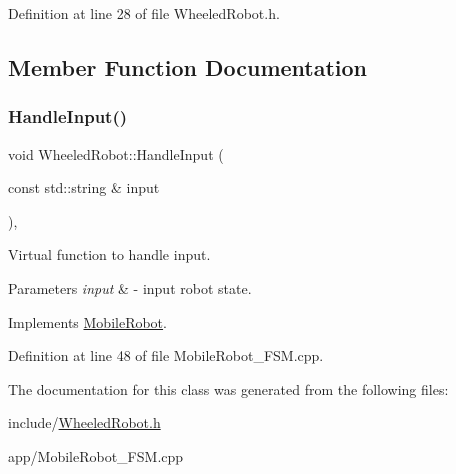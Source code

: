 Definition at line 28 of file Wheeled\+Robot.\+h.



\subsection{Member Function Documentation}
\mbox{\label{class_wheeled_robot_a481731d5b59ed97b432aac14de6036fd}} 
\subsubsection{\texorpdfstring{HandleInput()}{HandleInput()}}
{\footnotesize\ttfamily void Wheeled\+Robot\+::\+Handle\+Input (\begin{DoxyParamCaption}\item[{const std\+::string \&}]{input }\end{DoxyParamCaption})\hspace{0.3cm}{\ttfamily [override]}, {\ttfamily [virtual]}}



Virtual function to handle input. 


\begin{DoxyParams}{Parameters}
{\em input} & -\/ input robot state. \\
\hline
\end{DoxyParams}


Implements \mbox{\hyperlink{class_mobile_robot_a703aa7c008b6e9b5beb5017e7a6d020e}{Mobile\+Robot}}.



Definition at line 48 of file Mobile\+Robot\+\_\+\+F\+S\+M.\+cpp.



The documentation for this class was generated from the following files\+:\begin{DoxyCompactItemize}
\item 
include/\mbox{\hyperlink{_wheeled_robot_8h}{Wheeled\+Robot.\+h}}\item 
app/Mobile\+Robot\+\_\+\+F\+S\+M.\+cpp\end{DoxyCompactItemize}
